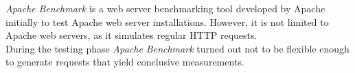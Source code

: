 \emph{Apache Benchmark} is a web server benchmarking tool developed by Apache initially to test Apache web server installations. However, it is not limited to Apache web servers, as it simulates regular HTTP requests.\\
During the testing phase \emph{Apache Benchmark} turned out not to be flexible enough to generate requests that yield conclusive measurements.
